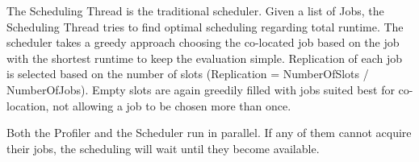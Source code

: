 \documentclass[
]{article}
\begin{document}
The Scheduling Thread is the traditional scheduler. Given a list of
Jobs, the Scheduling Thread tries to find optimal scheduling regarding
total runtime. The scheduler takes a greedy approach choosing the
co-located job based on the job with the shortest runtime to keep the
evaluation simple. Replication of each job is selected based on the
number of slots (Replication = NumberOfSlots / NumberOfJobs). Empty
slots are again greedily filled with jobs suited best for co-location,
not allowing a job to be chosen more than once.

Both the Profiler and the Scheduler run in parallel. If any of them
cannot acquire their jobs, the scheduling will wait until they become
available.
\end{document}
